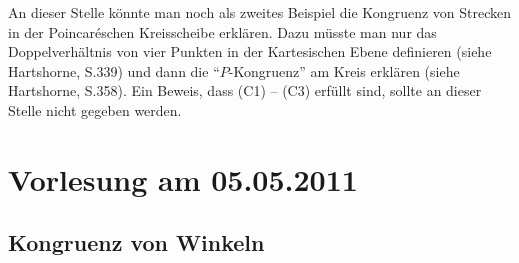 \begin{bem}
    An dieser Stelle könnte man noch als zweites Beispiel die Kongruenz von Strecken in der
    Poincaréschen Kreisscheibe erklären. Dazu müsste man nur das Doppelverhältnis von vier Punkten
    in der Kartesischen Ebene definieren (siehe Hartshorne, S.339) und dann die ``$P$-Kongruenz'' am
    Kreis erklären (siehe Hartshorne, S.358). Ein Beweis, dass (C1) -- (C3) erfüllt sind, sollte an
    dieser Stelle nicht gegeben werden.
\end{bem}

\section*{Vorlesung am 05.05.2011}

\subsection*{Kongruenz von Winkeln}

